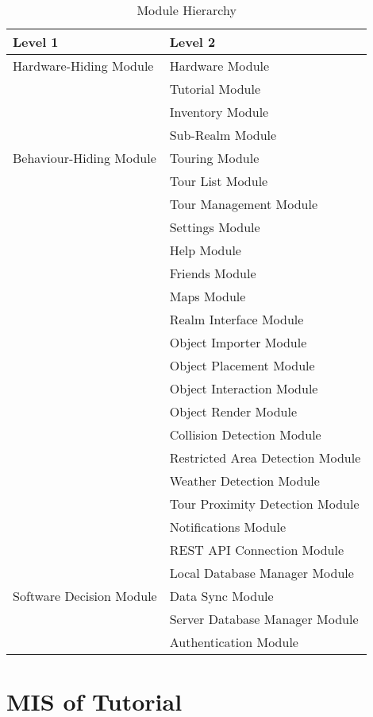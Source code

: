 \documentclass[12pt, titlepage]{article}
\begin{document}
\begin{table}[h!]
  \centering
  \begin{tabular}{p{} p{}}
    \toprule
    \textbf{Level 1}                               & \textbf{Level 2}                \\
    \midrule

{Hardware-Hiding Module} & Hardware Module\\
\midrule

\multirow{7}{0.3\textwidth}{Behaviour-Hiding Module} & Tutorial Module\\
& Inventory Module\\
& Sub-Realm Module\\
& Touring Module\\
& Tour List Module\\
& Tour Management Module\\
& Settings Module\\
& Help Module\\
& Friends Module\\
& Maps Module\\
& Realm Interface Module\\
& Object Importer Module\\
& Object Placement Module\\
& Object Interaction Module\\
& Object Render Module\\
& Collision Detection Module\\
& Restricted Area Detection Module\\
& Weather Detection Module\\
& Tour Proximity Detection Module\\
& Notifications Module\\
& REST API Connection Module\\
\midrule

\multirow{3}{0.3\textwidth}{Software Decision Module}
& Local Database Manager Module\\
& Data Sync Module\\
& Server Database Manager Module\\
& Authentication Module\\
\bottomrule

\end{tabular}
\caption{Module Hierarchy}
\label{TblMH}
\end{table}

\newpage

\section{MIS of Tutorial} \label{Tutorial}
\end{document}
